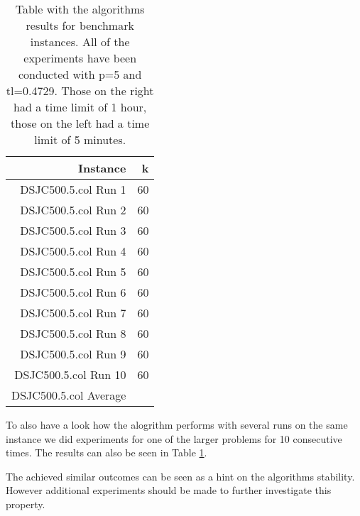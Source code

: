 \documentclass[a4paper]{scrartcl}
\begin{document}
\begin{table}
\begin{adjustwidth}{-.5in}{-.5in}
\begin{center}
\begin{tabular}{r | r  }
            \hline
Instance & k  \\
\hline \hline 

DSJC500.5.col Run 1 & 60 \\
DSJC500.5.col Run 2 & 60 \\
DSJC500.5.col Run 3 & 60 \\
DSJC500.5.col Run 4 & 60 \\
DSJC500.5.col Run 5 & 60 \\
DSJC500.5.col Run 6 & 60 \\
DSJC500.5.col Run 7 & 60 \\
DSJC500.5.col Run 8 & 60 \\
DSJC500.5.col Run 9 & 60 \\
DSJC500.5.col Run 10 & 60 \\
DSJC500.5.col Average &  \\ 



\hline
\end{tabular}
          
        \caption{Table with the algorithms results for benchmark instances. All of the experiments have been conducted with p=5 and tl=0.4729. Those on the right had a time limit of 1 hour, those on the left had a time limit of 5 minutes. }
        \label{myTable1}
        \end{center}
    \end{adjustwidth}
\end{table}

To also have a look how the alogrithm performs with several runs on the same instance we did experiments for one of the larger problems for 10 consecutive times.
The results can also be seen in Table \ref{myTable1}.



The achieved similar outcomes can be seen as a hint on the algorithms stability. However additional experiments should be made to further investigate this property.





\end{document}
